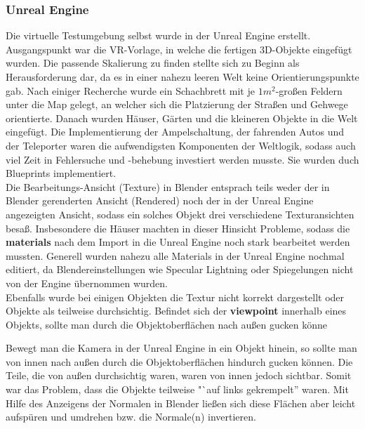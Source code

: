 \documentclass{Bericht}
\begin{document}
\subsubsection{Unreal Engine}
Die virtuelle Testumgebung selbst wurde in der Unreal Engine erstellt. Ausgangspunkt war die VR-Vorlage, in welche die fertigen 3D-Objekte eingefügt wurden. Die passende Skalierung zu finden stellte sich zu Beginn als Herausforderung dar, da es in einer nahezu leeren Welt keine Orientierungspunkte gab. Nach einiger Recherche wurde ein Schachbrett mit je $1m^{2}$-großen Feldern unter die Map gelegt, an welcher sich die Platzierung der Straßen und Gehwege orientierte. Danach wurden Häuser, Gärten und die kleineren Objekte in die Welt eingefügt.
Die Implementierung der Ampelschaltung, der fahrenden Autos und der Teleporter waren die aufwendigsten Komponenten der Weltlogik, sodass auch viel Zeit in Fehlersuche und -behebung investiert werden musste. Sie wurden duch Blueprints implementiert.\\

				
				
				Die Bearbeitungs-Ansicht (Texture) in Blender entsprach teils weder der in Blender gerenderten Ansicht (Rendered) noch der in der Unreal Engine angezeigten Ansicht, sodass ein solches Objekt drei verschiedene Texturansichten besaß. Insbesondere die Häuser machten in dieser Hinsicht Probleme, sodass die \textbf{materials} nach dem Import in die Unreal Engine noch stark bearbeitet werden mussten. 
			Generell wurden nahezu alle Materials in der Unreal Engine nochmal editiert, da Blendereinstellungen wie Specular Lightning oder Spiegelungen nicht von der Engine übernommen wurden.\\
			Ebenfalls wurde bei einigen Objekten die Textur nicht korrekt dargestellt oder Objekte als teilweise durchsichtig. Befindet sich der \textbf{viewpoint} innerhalb eines Objekts, sollte man durch die Objektoberflächen nach außen gucken könne
			
			 Bewegt man die Kamera in der Unreal Engine in ein Objekt hinein, so sollte man von innen nach außen durch die Objektoberflächen hindurch gucken können. 
			Die Teile, die von außen durchsichtig waren, waren von innen jedoch sichtbar. Somit war das Problem, dass die Objekte teilweise "`auf links gekrempelt'' waren. Mit Hilfe des Anzeigens der Normalen in Blender ließen sich diese Flächen aber leicht aufspüren und umdrehen bzw. die Normale(n) invertieren.
\end{document}
